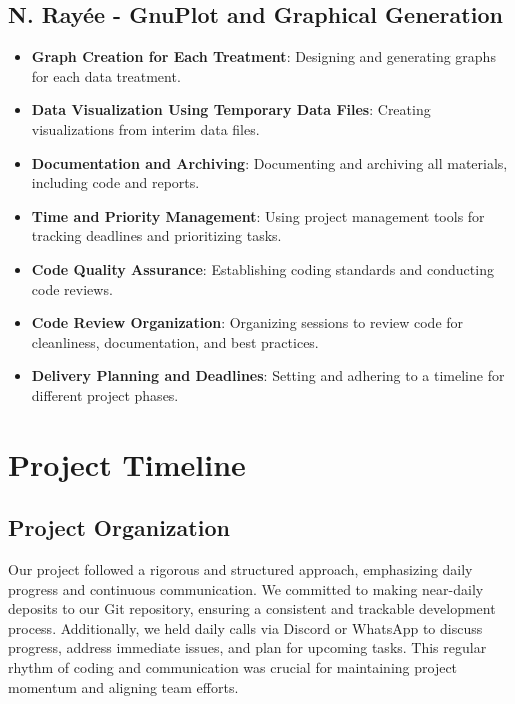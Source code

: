 \documentclass[11pt]{article}
\begin{document}
\subsection{N. Rayée - GnuPlot and Graphical Generation}
\begin{itemize}
    \item \textbf{Graph Creation for Each Treatment}: Designing and generating graphs for each data treatment.
    \item \textbf{Data Visualization Using Temporary Data Files}: Creating visualizations from interim data files.
    \item \textbf{Documentation and Archiving}: Documenting and archiving all materials, including code and reports.
    \item \textbf{Time and Priority Management}: Using project management tools for tracking deadlines and prioritizing tasks.
    \item \textbf{Code Quality Assurance}: Establishing coding standards and conducting code reviews.
    \item \textbf{Code Review Organization}: Organizing sessions to review code for cleanliness, documentation, and best practices.
    \item \textbf{Delivery Planning and Deadlines}: Setting and adhering to a timeline for different project phases.
\end{itemize}

\section{Project Timeline}

\subsection{Project Organization}
Our project followed a rigorous and structured approach, emphasizing daily progress and continuous communication. We committed to making near-daily deposits to our Git repository, ensuring a consistent and trackable development process. Additionally, we held daily calls via Discord or WhatsApp to discuss progress, address immediate issues, and plan for upcoming tasks. This regular rhythm of coding and communication was crucial for maintaining project momentum and aligning team efforts.

\vspace{0.5cm}
\end{document}
